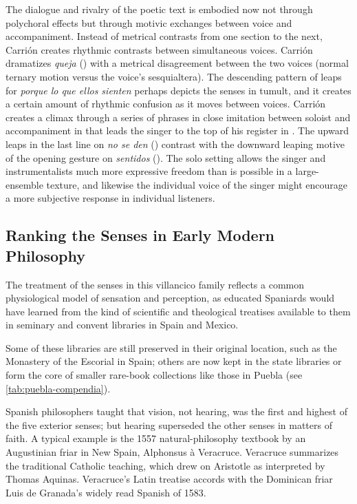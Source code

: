 The dialogue and rivalry of the poetic text is embodied now not through
polychoral effects but through motivic exchanges between voice and
accompaniment.
Instead of metrical contrasts from one section to the next, Carrión creates
rhythmic contrasts between simultaneous voices.
Carrión dramatizes \emph{queja} () with a metrical disagreement
between the two voices (normal ternary motion versus the voice's sesquialtera).
The descending pattern of leaps for \emph{porque lo que ellos sienten} perhaps
depicts the senses in tumult, and it creates a certain amount of rhythmic
confusion as it moves between voices.
Carrión creates a climax through a series of phrases in close imitation between
soloist and accompaniment in  that leads the singer to the top
of his register in .
The upward leaps in the last line on \emph{no se den} ()
contrast with the downward leaping motive of the opening gesture on
\emph{sentidos} ().
The solo setting allows the singer and instrumentalists much more expressive
freedom than is possible in a large-ensemble texture, and likewise the
individual voice of the singer might encourage a more subjective response in
individual listeners.


\subsection{Ranking the Senses in Early Modern Philosophy}

The treatment of the senses in this villancico family reflects a common
physiological model of sensation and perception, as educated Spaniards would
have learned from the kind of scientific and theological treatises available to
them in seminary and convent libraries in Spain and Mexico.%
\begin{Footnote}
    Some of these libraries are still preserved in their original location, such
    as the Monastery of the Escorial in Spain; others are now kept in the state
    libraries or form the core of smaller rare-book collections like those in
    Puebla (see \cref{tab:puebla-compendia}).
\end{Footnote}
Spanish philosophers taught that vision, not hearing, was the first and highest
of the five exterior senses; but hearing superseded the other senses in matters
of faith.
A typical example is the 1557 natural-philosophy textbook  by an Augustinian friar in New Spain, Alphonsus à Veracruce.%
    \Autocite{Veracruce:Phisica}
Veracruce summarizes the traditional Catholic teaching, which drew on Aristotle
as interpreted by Thomas Aquinas.
Veracruce's Latin treatise accords with the Dominican friar Luis de Granada's
widely read Spanish  of 1583.%
    \Autocites{LuisdeGranada:Simbolo}{LuisdeGranada-Balcells:SimboloPtI}

